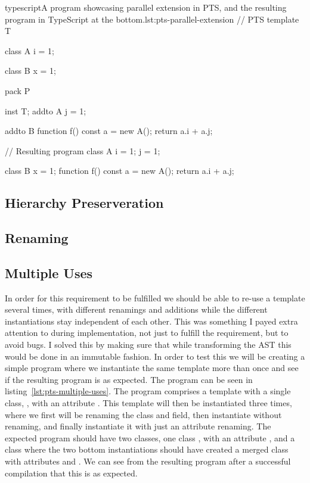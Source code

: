 \begin{code}{typescript}{A program showcasing parallel extension in PTS, and the resulting program in TypeScript at the bottom.}{lst:pts-parallel-extension}
    // PTS
    template T {
        class A {
            i = 1;
        }

        class B {
            x = 1;
        }
    }

    pack P {
        inst T;
        addto A {
            j = 1;
        }

        addto B {
            function f() {
                const a = new A();
                return a.i + a.j;
            }
        }
    }

    // Resulting program
    class A {
        i = 1;
        j = 1;
    }

    class B {
        x = 1;
        function f() {
            const a = new A();
            return a.i + a.j;
        }
    }
\end{code}

\subsection{Hierarchy Preserveration}

\subsection{Renaming}

\subsection{Multiple Uses}

In order for this requirement to be fulfilled we should be able to re-use a template several times, with different renamings and additions while the different instantiations stay independent of each other.
This was something I payed extra attention to during implementation, not just to fulfill the requirement, but to avoid bugs.
I solved this by making sure that while transforming the AST this would be done in an immutable fashion.
In order to test this we will be creating a simple program where we instantiate the same template more than once and see if the resulting program is as expected.
The program can be seen in listing~\vref{lst:pts-multiple-uses}.
The program comprises a template  with a single class, , with an attribute .
This template will then be instantiated three times, where we first will be renaming the class and field, then instantiate without renaming, and finally instantiate it with just an attribute renaming.
The expected program should have two classes, one class , with an attribute , and a class  where the two bottom instantiations should have created a merged class with attributes  and .
We can see from the resulting program after a successful compilation that this is as expected.

